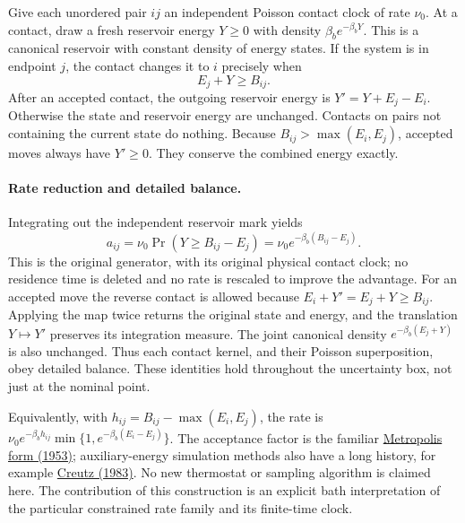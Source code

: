 \documentclass[11pt]{article}
\begin{document}
Give each unordered pair $ij$ an independent Poisson contact clock of
rate $\nu_0$. At a contact, draw a fresh reservoir energy
$Y\geq0$ with density $\beta_b e^{-\beta_bY}$. This is a canonical
reservoir with constant density of energy states. If the system is in
endpoint $j$, the contact changes it to $i$ precisely when
\[
 E_j+Y\geq B_{ij}.
\]
After an accepted contact, the outgoing reservoir energy is
$Y'=Y+E_j-E_i$. Otherwise the state and reservoir energy are unchanged.
Contacts on pairs not containing the current state do nothing.
Because $B_{ij}>\max(E_i,E_j)$, accepted moves always have $Y'\geq0$.
They conserve the combined energy exactly.

\paragraph{Rate reduction and detailed balance.}
Integrating out the independent reservoir mark yields
\[
 a_{ij}=\nu_0\Pr(Y\geq B_{ij}-E_j)
       =\nu_0e^{-\beta_b(B_{ij}-E_j)}.
\]
This is the original generator, with its original physical contact clock;
no residence time is deleted and no rate is rescaled to improve the
advantage. For an accepted move the reverse contact is allowed because
$E_i+Y'=E_j+Y\geq B_{ij}$. Applying the map twice returns the original
state and energy, and the translation $Y\mapsto Y'$ preserves its
integration measure. The joint canonical density
$e^{-\beta_b(E_j+Y)}$ is also unchanged. Thus each contact kernel, and
their Poisson superposition, obey detailed balance. These identities
hold throughout the uncertainty box, not just at the nominal point.

Equivalently, with $h_{ij}=B_{ij}-\max(E_i,E_j)$, the rate is
$\nu_0e^{-\beta_bh_{ij}}\min\{1,e^{-\beta_b(E_i-E_j)}\}$.
The acceptance factor is the familiar
\href{https://doi.org/10.1063/1.1699114}{Metropolis form (1953)};
auxiliary-energy simulation methods also have a long history, for example
\href{https://doi.org/10.1103/PhysRevLett.50.1411}{Creutz (1983)}.
No new thermostat or sampling algorithm is claimed here.
The contribution of this construction is an explicit bath interpretation
of the particular constrained rate family and its finite-time clock.
\end{document}
